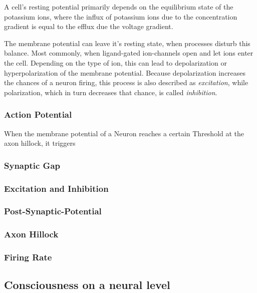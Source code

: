 A cell's resting potential primarily depends on the equilibrium state of the potassium ions,
where the influx of potassium ions due to the concentration gradient is equal to the efflux due the voltage gradient.

The membrane potential can leave it's resting state, when processes disturb this balance.
Most commonly, when ligand-gated ion-channels open and let ions enter the cell.
Depending on the type of ion, this can lead to depolarization or hyperpolarization of the membrane potential.
Because depolarization increases the chances of a neuron firing, this process is also described as \textit{excitation},
while polarization, which in turn decreases that chance, is called \textit{inhibition}.
\subsubsection{Action Potential}
When the membrane potential of a Neuron reaches a certain Threshold at the axon hillock, it triggers 
\subsubsection{Synaptic Gap}
\subsubsection{Excitation and Inhibition}
\subsubsection{Post-Synaptic-Potential}
\subsubsection{Axon Hillock}
\subsubsection{Firing Rate}
\subsection{Consciousness on a neural level}\label{subsec:consciousness-on-a-neural-level}

